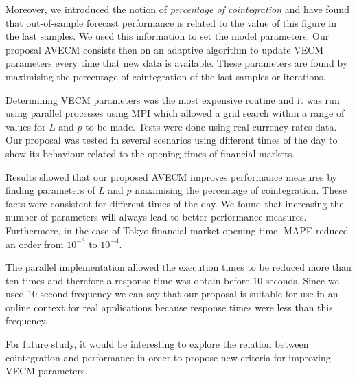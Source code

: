 Moreover, we introduced the notion of {\em percentage of cointegration\/} and
have found that out-of-sample forecast performance is related to the value of
this figure in the last samples.  We used this information to set the model
parameters.  Our proposal AVECM consists then on an adaptive algorithm to update VECM
parameters every time that new data is available. These parameters are found by
maximising the percentage of cointegration of the last samples or iterations.

Determining VECM parameters was the most expensive routine and it was run
using parallel processes using MPI which allowed a grid search within a range of
values for $L$ and $p$ to be made.
Tests were done using real currency rates data. 
Our proposal was tested in several scenarios using different times of
the day to show its behaviour related to the opening times of
financial markets.

Results showed that our proposed AVECM improves performance measures by finding
parameters of $L$ and $p$ maximising the percentage of cointegration.
These facts were consistent for different times of the day. 
We found that increasing the number of parameters will always lead to
better performance measures. Furthermore, in the case of Tokyo 
financial market opening time, MAPE reduced an order from $10^{-3}$ to $10^{-4}$.

The parallel implementation allowed the execution times to be reduced
more than ten times and therefore a response time was obtain before 10
seconds. Since we used 10-second frequency we can say that our proposal is suitable
for use in an online context for real applications because response times
were less than this frequency.

For future study, it would be interesting to explore the relation between
cointegration and performance in order to propose new criteria for
improving VECM parameters.



